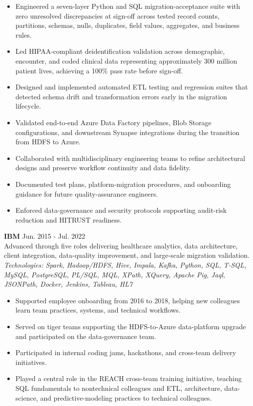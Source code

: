 \begin{itemize}
  \item Engineered a seven-layer Python and SQL migration-acceptance suite with zero unresolved discrepancies at sign-off across tested record counts, partitions, schemas, nulls, duplicates, field values, aggregates, and business rules.
  \item Led HIPAA-compliant deidentification validation across demographic, encounter, and coded clinical data representing approximately 300 million patient lives, achieving a 100\% pass rate before sign-off.
  \item Designed and implemented automated ETL testing and regression suites that detected schema drift and transformation errors early in the migration lifecycle.
  \item Validated end-to-end Azure Data Factory pipelines, Blob Storage configurations, and downstream Synapse integrations during the transition from HDFS to Azure.
  \item Collaborated with multidisciplinary engineering teams to refine architectural designs and preserve workflow continuity and data fidelity.
  \item Documented test plans, platform-migration procedures, and onboarding guidance for future quality-assurance engineers.
  \item Enforced data-governance and security protocols supporting audit-risk reduction and HITRUST readiness.
\end{itemize}

\textbf{IBM} \hfill Jun. 2015 - Jul. 2022\\
Advanced through five roles delivering healthcare analytics, data architecture, client integration, data-quality improvement, and large-scale migration validation.\\[-1pt]
\textit{Technologies: Spark, Hadoop/HDFS, Hive, Impala, Kafka, Python, SQL, T-SQL, MySQL, PostgreSQL, PL/SQL, MQL, XPath, XQuery, Apache Pig, Jaql, JSONPath, Docker, Jenkins, Tableau, HL7}
\begin{itemize}
  \item Supported employee onboarding from 2016 to 2018, helping new colleagues learn team practices, systems, and technical workflows.
  \item Served on tiger teams supporting the HDFS-to-Azure data-platform upgrade and participated on the data-governance team.
  \item Participated in internal coding jams, hackathons, and cross-team delivery initiatives.
  \item Played a central role in the REACH cross-team training initiative, teaching SQL fundamentals to nontechnical colleagues and ETL, architecture, data-science, and predictive-modeling practices to technical colleagues.
\end{itemize}

